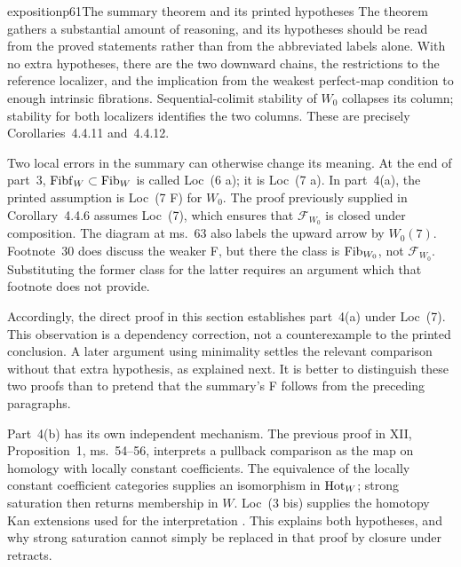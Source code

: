 \begin{dcomment}{exposition}{p61}{The summary theorem and its printed hypotheses}
The theorem gathers a substantial amount of reasoning, and its hypotheses should be read from the proved statements rather than from the abbreviated labels alone. With no extra hypotheses, there are the two downward chains, the restrictions to the reference localizer, and the implication from the weakest perfect-map condition to enough intrinsic fibrations. Sequential-colimit stability of $W_0$ collapses its column; stability for both localizers identifies the two columns. These are precisely Corollaries~4.4.11 and~4.4.12.

Two local errors in the summary can otherwise change its meaning. At the end of part~3, $\mathrm{Fibf}_W\subset\mathrm{Fib}_W$ is called Loc~(6 a); it is Loc~(7 a). In part~4(a), the printed assumption is Loc~(7 F) for $W_0$. The proof previously supplied in Corollary~4.4.6 assumes Loc~(7), which ensures that $\mathcal F_{W_0}$ is closed under composition. The diagram at ms.~63 also labels the upward arrow by $W_0(7)$. Footnote~30 does discuss the weaker F, but there the class is $\mathrm{Fib}_{W_0}$, not $\mathcal F_{W_0}$. Substituting the former class for the latter requires an argument which that footnote does not provide.

Accordingly, the direct proof in this section establishes part~4(a) under Loc~(7). This observation is a dependency correction, not a counterexample to the printed conclusion. A later argument using minimality settles the relevant comparison without that extra hypothesis, as explained next. It is better to distinguish these two proofs than to pretend that the summary's F follows from the preceding paragraphs.

Part~4(b) has its own independent mechanism. The previous proof in XII, Proposition~1, ms.~54--56, interprets a pullback comparison as the map on homology with locally constant coefficients. The equivalence of the locally constant coefficient categories supplies an isomorphism in $\mathrm{Hot}_W$; strong saturation then returns membership in $W$. Loc~(3 bis) supplies the homotopy Kan extensions used for the interpretation \citep{Grothendieck1990XIIa}. This explains both hypotheses, and why strong saturation cannot simply be replaced in that proof by closure under retracts.
\end{dcomment}


